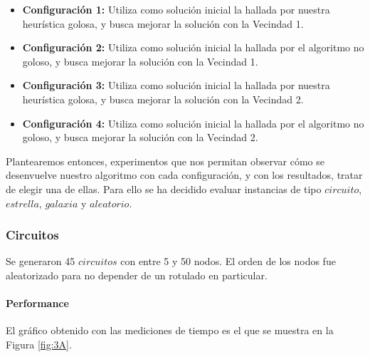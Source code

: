 \begin{itemize}
	\item {\bf Configuración 1:} Utiliza como solución inicial la hallada por nuestra heurística golosa, y busca mejorar la solución con la Vecindad 1.
	\item {\bf Configuración 2:} Utiliza como solución inicial la hallada por el algoritmo no goloso, y busca mejorar la solución con la Vecindad 1.
	\item {\bf Configuración 3:} Utiliza como solución inicial la hallada por nuestra heurística golosa, y busca mejorar la solución con la Vecindad 2.
	\item {\bf Configuración 4:} Utiliza como solución inicial la hallada por el algoritmo no goloso, y busca mejorar la solución con la Vecindad 2.

\end{itemize}

Plantearemos entonces, experimentos que nos permitan observar cómo se desenvuelve nuestro algoritmo con cada configuración, y con los resultados, tratar de elegir una de ellas. Para ello se ha decidido evaluar instancias de tipo $circuito$, $estrella$, $galaxia$ y $aleatorio$.
 
\subsubsection{Circuitos}

Se generaron 45 $circuitos$ con entre 5 y 50 nodos.  El orden de los nodos fue aleatorizado para no depender de un rotulado en particular.

\paragraph{Performance} 

El gráfico obtenido con las mediciones de tiempo es el que se muestra en la Figura \ref{fig:3A}.

